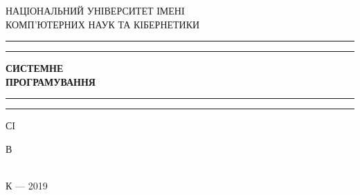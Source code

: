 
% 

\begin{titlepage} %

	\centering
	
	{ НАЦІОНАЛЬНИЙ УНІВЕРСИТЕТ ІМЕНІ   \\  КОМП'ЮТЕРНИХ НАУК ТА КІБЕРНЕТИКИ}
	
	\vfill
	
	\rule{\textwidth}{1.6pt}\vspace*{-\baselineskip}\vspace*{2pt} %
	\rule{\textwidth}{0.4pt} %
	
	\vspace{0.75\baselineskip}
	
	{\huge \bfseries СИСТЕМНЕ\\ ПРОГРАМУВАННЯ\\}
	
	\vspace{0.75\baselineskip}
	
	\rule{\textwidth}{0.4pt}\vspace*{-\baselineskip}\vspace{3.2pt} %
	\rule{\textwidth}{1.6pt} %
	
	\vspace{\baselineskip}
	
	{С І   }
	
	\vfill
	
	{ \Large В \\   \\}
	
	\vfill
	
	\vfill
	
	{К{\normalsize} --- 2019}

\end{titlepage}

% 